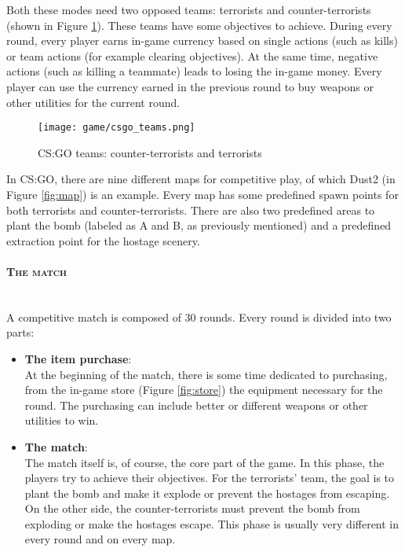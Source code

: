 	Both these modes need two opposed teams: terrorists and counter-terrorists (shown in Figure \ref{fig:teams}). 
	These teams have some objectives to achieve. 
	During every round, every player earns in-game currency based on single actions (such as kills) or team actions (for example clearing objectives). 
	At the same time, negative actions (such as killing a teammate) leads to losing the in-game money. 
	Every player can use the currency earned in the previous round to buy weapons or other utilities for the current round. 
	
	\begin{figure}[!h] 
		\centering 
		\texttt{[image: game/csgo\_teams.png]}
		\caption{\label{fig:teams}CS:GO teams: counter-terrorists and terrorists}
	\end{figure}

	In CS:GO, there are nine different maps for competitive play, of which Dust2 (in Figure \ref{fig:map}) is an example. 
	Every map has some predefined spawn points for both terrorists and counter-terrorists. 
	There are also two predefined areas to plant the bomb (labeled as A and B, as previously mentioned) and a predefined extraction point for the hostage scenery.

	\paragraph{\textsc{The match}}\\

		A competitive match is composed of 30 rounds. Every round is divided into two parts:
		
		\begin{itemize}
		
			\item \textbf{The item purchase}:\\
				At the beginning of the match, there is some time dedicated to purchasing, from the in-game store (Figure \ref{fig:store}) the equipment necessary for the round. 
				The purchasing can include better or different weapons or other utilities to win.
			
			\item \textbf{The match}:\\
				The match itself is, of course,  the core part of the game. In this phase, the players try to achieve their objectives. 
				For the terrorists' team, the goal is to plant the bomb and make it explode or prevent the hostages from escaping. 
				On the other side, the counter-terrorists must prevent the bomb from exploding or make the hostages escape. 
				This phase is usually very different in every round and on every map.
			
		\end{itemize}
	

